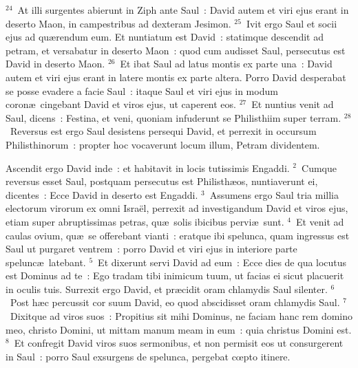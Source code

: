 ${}^{24}$~At illi surgentes abierunt in Ziph ante Saul~: David autem et viri ejus erant in deserto Maon, in campestribus ad dexteram Jesimon.
${}^{25}$~Ivit ergo Saul et socii ejus ad qu\ae rendum eum. Et nuntiatum est David~: statimque descendit ad petram, et versabatur in deserto Maon~: quod cum audisset Saul, persecutus est David in deserto Maon.
${}^{26}$~Et ibat Saul ad latus montis ex parte una~: David autem et viri ejus erant in latere montis ex parte altera. Porro David desperabat se posse evadere a facie Saul~: itaque Saul et viri ejus in modum coron\ae\ cingebant David et viros ejus, ut caperent eos.
${}^{27}$~Et nuntius venit ad Saul, dicens~: Festina, et veni, quoniam infuderunt se Philisthiim super terram.
${}^{28}$~Reversus est ergo Saul desistens persequi David, et perrexit in occursum Philisthinorum~: propter hoc vocaverunt locum illum, Petram dividentem.

\lettrine[lines=10,image=true,loversize=0.05,lraise=-0.03]{A}{}scendit ergo David inde~: et habitavit in locis tutissimis Engaddi.
${}^{2}$~Cumque reversus esset Saul, postquam persecutus est Philisth\ae os, nuntiaverunt ei, dicentes~: Ecce David in deserto est Engaddi.
${}^{3}$~Assumens ergo Saul tria millia electorum virorum ex omni Isra\"el, perrexit ad investigandum David et viros ejus, etiam super abruptissimas petras, qu\ae\ solis ibicibus pervi\ae\ sunt.
${}^{4}$~Et venit ad caulas ovium, qu\ae\ se offerebant vianti~: eratque ibi spelunca, quam ingressus est Saul ut purgaret ventrem~: porro David et viri ejus in interiore parte spelunc\ae\ latebant.
${}^{5}$~Et dixerunt servi David ad eum~: Ecce dies de qua locutus est Dominus ad te~: Ego tradam tibi inimicum tuum, ut facias ei sicut placuerit in oculis tuis. Surrexit ergo David, et pr\ae cidit oram chlamydis Saul silenter.
${}^{6}$~Post h\ae c percussit cor suum David, eo quod abscidisset oram chlamydis Saul.
${}^{7}$~Dixitque ad viros suos~: Propitius sit mihi Dominus, ne faciam hanc rem domino meo, christo Domini, ut mittam manum meam in eum~: quia christus Domini est.
${}^{8}$~Et confregit David viros suos sermonibus, et non permisit eos ut consurgerent in Saul~: porro Saul exsurgens de spelunca, pergebat cœpto itinere.


